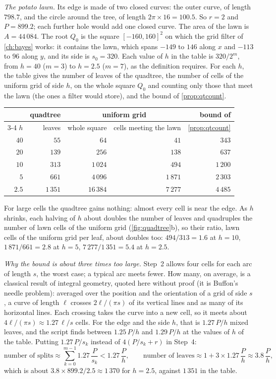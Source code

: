 \emph{The potato lawn.} Its edge is made of two closed curves: the outer
curve, of length $798.7$, and the circle around the tree, of length
$2\pi\times16=100.5$. So $r=2$ and $P=899.2$; each further hole would add
one closed curve. The area of the lawn is $A=44\,084$. The root $Q_0$ is the square
$[-160,160]^2$ on which the grid filter of \cref{ch:bayes} works: it
contains the lawn, which spans $-149$ to $146$ along $x$ and $-113$ to
$96$ along $y$, and its side is $s_0=320$. Each value of $h$ in the
table is $320/2^m$, from $h=40$ ($m=3$) to $h=2.5$ ($m=7$), as the
definition requires. For each
$h$, the table gives the number of leaves of the quadtree, the number of
cells of the uniform grid of side $h$, on the whole square $Q_0$ and
counting only those that meet the lawn (the ones a filter would store),
and the bound of \cref{prop:qtcount}.
\begin{center}
\small
\begin{tabular}{@{}rrrrr@{}}
\toprule
 & quadtree & \multicolumn{2}{c}{uniform grid} & bound of\\
\cmidrule(lr){3-4}
$h$ & leaves & whole square & cells meeting the lawn &
\cref{prop:qtcount}\\
\midrule
$40$  & $55$    & $64$     & $41$    & $343$\\
$20$  & $139$   & $256$    & $138$   & $637$\\
$10$  & $313$   & $1\,024$ & $494$   & $1\,200$\\
$5$   & $661$   & $4\,096$ & $1\,871$ & $2\,303$\\
$2.5$ & $1\,351$ & $16\,384$ & $7\,277$ & $4\,485$\\
\bottomrule
\end{tabular}
\end{center}
For large cells the quadtree gains nothing: almost every cell is near the
edge. As $h$ shrinks, each halving of $h$ about doubles the number of
leaves and quadruples the number of lawn cells of the uniform grid
(\cref{fig:quadtree}b), so their ratio, lawn cells of the uniform grid
per leaf, about doubles too: $494/313=1.6$ at $h=10$, $1\,871/661=2.8$
at $h=5$, $7\,277/1\,351=5.4$ at $h=2.5$.

\emph{Why the bound is about three times too large.} Step~2 allows four
cells for each arc of length $s$, the worst case; a typical arc meets
fewer. How many, on average, is a classical result of integral geometry,
quoted here without proof (it is Buffon's needle problem): averaged over
the position and the orientation of a grid of side $s$, a curve of length
$\ell$ crosses $2\ell/(\pi s)$ of its vertical lines and as many of its
horizontal lines. Each crossing takes the curve into a new cell, so it
meets about $4\ell/(\pi s)\approx1.27\,\ell/s$ cells. For the edge and
the side $h$, that is $1.27\,P/h$ mixed leaves, and the script finds
between $1.25\,P/h$ and $1.29\,P/h$ at the values of $h$ of the table.
Putting $1.27\,P/s_k$ instead of $4(P/s_k+r)$ in Step~4:
\[
  \text{number of splits}\approx\sum_{k=0}^{m-1}1.27\,\frac P{s_k}
  <1.27\,\frac Ph,
  \qquad
  \text{number of leaves}\approx1+3\times1.27\,\frac Ph\approx3.8\,\frac Ph ,
\]
which is about $3.8\times899.2/2.5\approx1\,370$ for $h=2.5$, against
$1\,351$ in the table.

